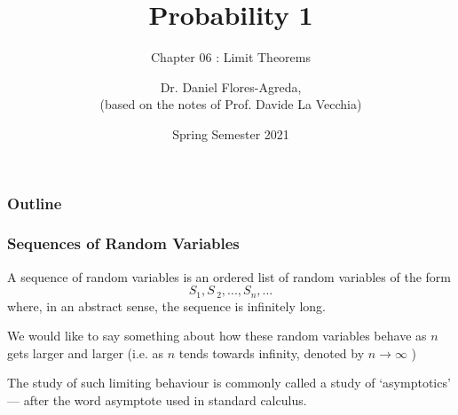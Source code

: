 \documentclass[notes=show,smaller,handout]{beamer}\usepackage[]{graphicx}\usepackage[]{color}
\begin{document}
\title[S110015]{Probability 1}
\subtitle{Chapter 06 : Limit Theorems}
\author[Flores-Agreda, La Vecchia]{Dr. Daniel Flores-Agreda, \\[0.5em] \tiny{(based on the notes of Prof. Davide La Vecchia)}}
\date{Spring Semester 2021}

\begin{frame}
\titlepage
\end{frame}


\begin{frame}
\frametitle{Outline}
\tableofcontents
\end{frame}

\begin{frame}%

\frametitle{Sequences of Random Variables }

\begin{definition}
 A sequence of random variables is an ordered list of random variables
of the form%
\begin{equation*}
S_{1},S\,_{2},...,S_{n},...
\end{equation*}
where, in an abstract sense, the sequence is infinitely long.
\end{definition}

\vspace{0.4cm}

We would like to say something about how these random variables behave as $n$ gets larger and larger (i.e. as $n$
tends towards infinity, denoted by $n\rightarrow\infty$ )

\vspace{0.4cm}
The study of such limiting behaviour is commonly called a study of \color{blue}`asymptotics' \color{black} --- after the word asymptote used in standard calculus.

\end{frame}%
\end{document}
